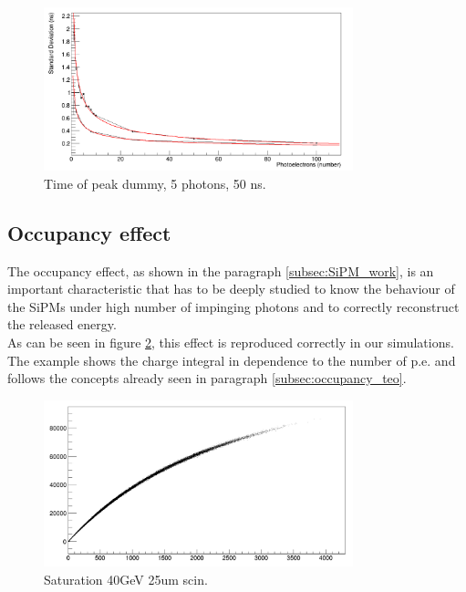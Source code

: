 \begin{figure}
	\centering
	\includegraphics[width=0.8\textwidth]{IMG/top_sigma}
	\caption{Time of peak dummy, 5 photons, 50 ns.}
	\label{fig:top_sigma}
\end{figure}


\subsection{Occupancy effect} \label{subsec:Sat_effect}
The occupancy effect, as shown in the paragraph \ref{subsec:SiPM_work}, is an important characteristic that has to be deeply studied to know the behaviour of the SiPMs under high number of impinging photons and to correctly reconstruct the released energy.\\

As can be seen in figure \ref{fig:sat_example}, this effect is reproduced correctly in our simulations. The example shows the charge integral in dependence to the number of p.e. and follows the concepts already seen in paragraph \ref{subsec:occupancy_teo}.\\

\begin{figure}
	\centering
	\includegraphics[width=0.8\textwidth]{IMG/Saturation_40GeV_25um_scin}
	\caption{Saturation 40GeV 25um scin.}
	\label{fig:sat_example}
\end{figure}

